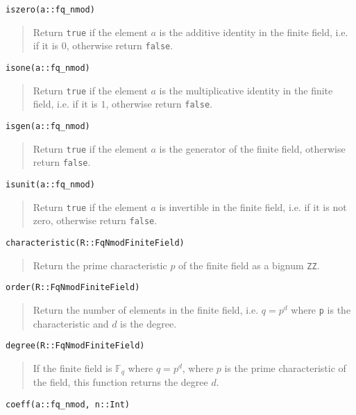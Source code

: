 \documentclass[a4paper,10pt]{article}
\newcommand{\F}{\mathbb{F}}
\newcommand{\code}{\lstinline}
\newcommand{\desc}[1]{\vspace{-3mm}\begin{quote}#1\end{quote}}
\begin{document}
{{\begin{lstlisting}
iszero(a::fq_nmod)
\end{lstlisting}

\desc{Return \code{true} if the element $a$ is the additive identity in the
finite field, i.e. if it is $0$, otherwise return \code{false}.}

\begin{lstlisting}
isone(a::fq_nmod)
\end{lstlisting}

\desc{Return \code{true} if the element $a$ is the multiplicative identity in
the finite field, i.e. if it is $1$, otherwise return \code{false}.}

\begin{lstlisting}
isgen(a::fq_nmod)
\end{lstlisting}

\desc{Return \code{true} if the element $a$ is the generator of the finite field,
otherwise return \code{false}.}

\begin{lstlisting}
isunit(a::fq_nmod)
\end{lstlisting}

\desc{Return \code{true} if the element $a$ is invertible in the finite field,
i.e. if it is not zero, otherwise return \code{false}.}

\begin{lstlisting}
characteristic(R::FqNmodFiniteField)
\end{lstlisting}

\desc{Return the prime characteristic $p$ of the finite field as a bignum
\code{ZZ}.}

\begin{lstlisting}
order(R::FqNmodFiniteField)
\end{lstlisting}

\desc{Return the number of elements in the finite field, i.e. $q = p^d$
where \code{p} is the characteristic and $d$ is the degree.}

\begin{lstlisting}
degree(R::FqNmodFiniteField)
\end{lstlisting}

\desc{If the finite field is $\F_q$ where $q = p^d$, where $p$ is the
prime characteristic of the field, this function returns the degree
$d$.}

\begin{lstlisting}
coeff(a::fq_nmod, n::Int)
\end{lstlisting}

}}
\end{document}
